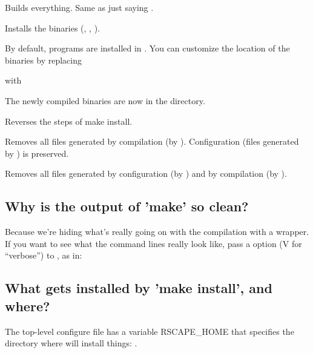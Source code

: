 \begin{sreitems}{}

\item[\emprog{all}]
  Builds everything. Same as just saying .

\item[\emprog{install}] 
  Installs the binaries (, , ).

  By default, programs are installed in
  . 
  You can customize the location of the binaries by replacing
  
  
  with
  
  
  The newly compiled binaries are now in the
   directory.\\
  
\item[\emprog{uninstall}]
  Reverses the steps of make install. 


\item[\emprog{clean}]
  Removes all files generated by compilation (by
  ). Configuration (files generated by
  ) is preserved.

\item[\emprog{distclean}]
  Removes all files generated by configuration (by )
  and by compilation (by ). 

\end{sreitems}

\subsection{Why is the output of 'make' so clean?}

Because we're hiding what's really going on with the compilation with
a wrapper.  If you want to see what the command lines really look
like, pass a  option (V for ``verbose'') to ,
as in:


\subsection{What gets installed by 'make install', and where?}

The top-level configure file has a variable RSCAPE\_HOME that
specifies the directory where  will install
things: .\\

